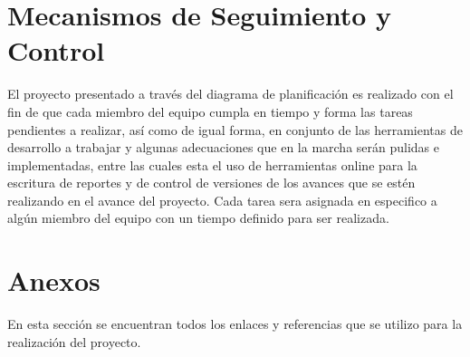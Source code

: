 \documentclass[10pt,executivepaper]{article}
\begin{document}
\section{Mecanismos de Seguimiento y Control}
El proyecto presentado a través del diagrama de planificación es realizado con el fin de que cada miembro del equipo cumpla en tiempo y forma las tareas pendientes a realizar, así como de igual forma, en conjunto de las herramientas de desarrollo a trabajar y algunas adecuaciones que en la marcha serán pulidas e implementadas, entre las cuales esta el uso de herramientas online para la escritura de reportes y de control de versiones de los avances que se estén realizando en el avance del proyecto. Cada tarea sera asignada en especifico a algún miembro del equipo con un tiempo definido para ser realizada.

\section{Anexos}
En esta sección se encuentran todos los enlaces y referencias que se utilizo para la realización del proyecto.
\end{document}
